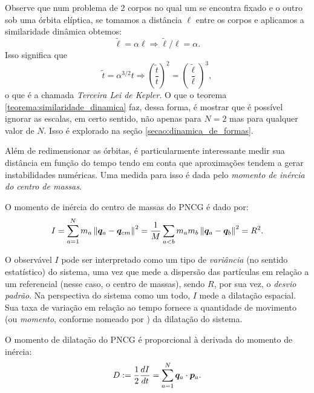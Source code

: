 Observe que num problema de 2 corpos no qual um se encontra fixado e o outro sob uma órbita elíptica, se tomamos a distância $\ell$ entre os corpos e aplicamos a similaridade dinâmica obtemos:
\begin{equation*}
    \tilde \ell = \alpha \ell \Rightarrow \tilde \ell / \ell  = \alpha.
\end{equation*}
Isso significa que
\begin{equation*}
    \tilde t = \alpha^{3/2} t \Rightarrow \left(\dfrac{\tilde t}{t}\right)^2 = \left(\dfrac{\tilde \ell}{\ell}\right)^3,
\end{equation*}
o que é a chamada \textit{Terceira Lei de Kepler}. O que o teorema \ref{teorema:similaridade_dinamica} faz, dessa forma, é mostrar que é possível ignorar as escalas, em certo sentido, não apenas para $N=2$ mas para qualquer valor de $N$. Isso é explorado na seção \ref{secao:dinamica_de_formas}.

Além de redimensionar as órbitas, é particularmente interessante medir sua distância em função do tempo tendo em conta que aproximações tendem a gerar instabilidades numéricas. Uma medida para isso é dada pelo \textit{momento de inércia do centro de massas}.

\begin{definition}\label{def:momento_inercia}
    O momento de inércia do centro de massas do PNCG é dado por:
    \begin{equation*}
        I 
        = \sum_{a=1}^{N} m_a \left\Vert \bm q_a - \bm q_{cm} \right\Vert^2
        = \dfrac{1}{M} \sum_{a < b} m_a m_b \left\Vert \bm q_a - \bm q_b \right\Vert^2
        =  R^2.
    \end{equation*}
\end{definition}

O observável $I$ pode ser interpretado como um tipo de \textit{variância} (no sentido estatístico) do sistema, uma vez que mede a dispersão das partículas em relação a um referencial (nesse caso, o centro de massas), sendo $R$, por sua vez, o \textit{desvio padrão}. Na perspectiva do sistema como um todo, $I$ mede a dilatação espacial. Sua taxa de variação em relação ao tempo fornece a quantidade de movimento (ou \textit{momento}, conforme nomeado por \cite{Barbour2003_scale_invariant_gravity}) da dilatação do sistema.

\begin{definition}
    O momento de dilatação do PNCG é proporcional à derivada do momento de inércia:
    \begin{equation*}
        D := \dfrac{1}{2} \dfrac{d I}{d t} = \sum_{a=1}^{N} \bm q_a \cdot \bm p_a.
    \end{equation*}
\end{definition}

